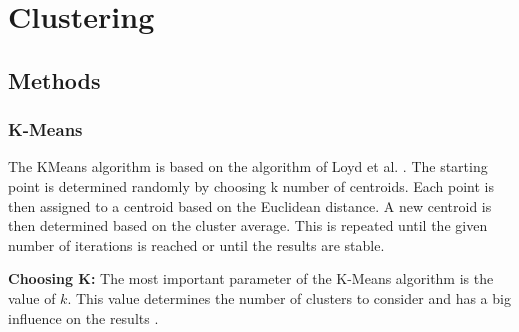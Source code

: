 \section{Clustering}

\subsection{Methods}
\subsubsection{K-Means} \label{theory:kmeans}
The KMeans algorithm is based on the algorithm of Loyd et al. .
The starting point is determined randomly by choosing k number of centroids.
Each point is then assigned to a centroid based on the Euclidean distance.
A new centroid is then determined based on the cluster average.
This is repeated until the given number of iterations is reached or until the results are stable.

\textbf{Choosing K:} The most important parameter of the K-Means algorithm is the value of $k$.
This value determines the number of clusters to consider and has a big influence on the results \citep{ahmed_k-means_2020-1}.

